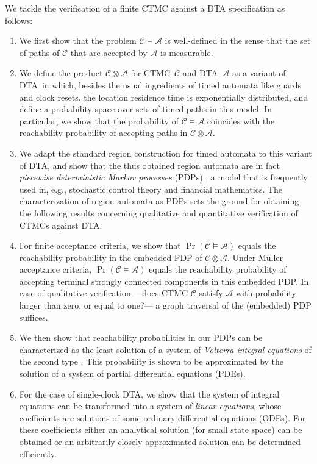 \documentclass{LMCS}
\newcommand{\mc}[1]{\mathcal{#1}}
\newcommand{\<}{\langle}
\renewcommand{\>}{\rangle}
\newcommand{\CTMC}{\textsc{{CTMC}}}
\newcommand{\DTA}{\textsc{DTA}}
\newcommand{\PDP}{\textsc{PDP}}
\begin{document}
We tackle the verification of a finite CTMC against a DTA specification as follows:
\begin{enumerate}[(1)]
\item
We first show that the problem $\mc{C} \models \mc{A}$ is well-defined in the
sense that the set of paths of $\mc{C}$ that are accepted by $\mc{A}$ is measurable.
\item
We define the product $\mc{C} \otimes \mc{A}$ for \CTMC\ $\mathcal{C}$ and \DTA\
$\mathcal{A}$ as a variant of \DTA\ in which, besides the usual ingredients of timed
automata like guards and clock resets, the location residence time is exponentially
distributed, and define a probability space over sets of timed paths in this model.
In particular, we show that the probability of $\mc{C} \models \mc{A}$ coincides with
the reachability probability of accepting paths in $\mc{C} \otimes \mc{A}$.
\item
We adapt the standard region construction for timed automata \cite{AD94} to this
variant of \DTA, and show that the thus obtained region automata are in fact \emph{piecewise deterministic Markov processes} (\PDP s) \cite{Dav93}, a model that is frequently
used in, e.g., stochastic control theory and financial mathematics.
The characterization of region automata as PDPs sets the ground for obtaining the
following results concerning qualitative and quantitative verification of CTMCs against
DTA.
\item
For finite acceptance criteria, we show that $\Pr(\mc{C} \models \mc{A})$ equals the
reachability probability in the embedded PDP of $\mc{C} \otimes \mc{A}$.
Under Muller acceptance criteria, $\Pr(\mc{C} \models \mc{A})$ equals the reachability
probability of accepting terminal strongly connected components in this embedded
PDP.
In case of qualitative verification ---does CTMC $\mc{C}$ satisfy $\mc{A}$ with probability
larger than zero, or equal to one?--- a graph traversal of the (embedded) PDP suffices.
\item
We then show that reachability probabilities in our PDPs can be characterized as the
least solution of a system of \emph{Volterra integral equations} of the second type
\cite{AWW95}.
This probability is shown to be approximated by the solution of a system of partial
differential equations (PDEs).
\item For the case of single-clock DTA, we show that the system of integral equations can be
transformed into a system of \emph{linear equations}, whose coefficients are solutions
of some ordinary differential equations (ODEs).
For these coefficients either an analytical solution (for small state space) can be obtained
or an arbitrarily closely approximated solution can be determined efficiently.
\end{enumerate}
\end{document}
